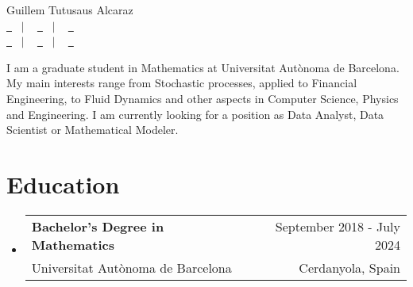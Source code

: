 \documentclass[a4paper,11pt,dvipsnames]{article}
\makeatletter
\newcommand{\resumeQuadHeading}[4]{
	\item
	\begin{tabular*}{0.96\textwidth}[t]{l@{\extracolsep{\fill}}r}
		\textbf{#1} & \small #2 \\
		\small#3 & \small #4 \\
	\end{tabular*}
}
\newcommand{\resumeHeadingListStart}{
	\begin{itemize}[leftmargin=0.15in, label={}]
	}
\newcommand{\resumeHeadingListEnd}{\end{itemize}}
\makeatother
\begin{document}
	
	\begin{center}
		{\Huge Guillem Tutusaus Alcaraz\vspace{2pt}} \\[1.25pc]
		\href{https://guillemtutusausalcaraz.weebly.com/}{\faLink \ } \ $|$ \ %
		\href{https://www.linkedin.com/in/guillemtutusausalcaraz/}{\faLinkedinSquare \ } \ $|$ \ %
		\href{https://github.com/Tutusaus}{\faGithub \ } \\[0.1pc] %
		\href{tel:+32674294157}{\faPhone \ } \ $|$ \ %
		\href{mailto:guillemtutusaus@gmail.com}{\faEnvelope \ } \ $|$ \ %
		\href{https://www.google.es/maps/place/Terrassa,+Barcelona/@41.558308,1.9759349,13z/data=!3m1!4b1!4m6!3m5!1s0x12a492e820fabbfd:0xab0d33c5f2c73098!8m2!3d41.5631482!4d2.0054917!16zL20vMGoycTc?hl=ca&entry=ttu}{\faHome \ } \\[1.5pc] %
	\end{center}
	
	\begin{justify}
		I am a graduate student in Mathematics at Universitat Autònoma de Bar\-ce\-lo\-na. My main interests range from Stochastic processes, applied to Financial Engineering, to Fluid Dynamics and other aspects in Computer Science, Physics and Engineering. I am currently looking for a position as Data Analyst, Data Scientist or Mathematical Modeler.
	\end{justify}
	
	
	
	\section{Education}
	
	\resumeHeadingListStart{}
	\resumeQuadHeading{Bachelor's Degree in Mathematics}{September 2018 - July 2024}
	{Universitat Autònoma de Barcelona}{Cerdanyola, Spain}
	\resumeHeadingListEnd{}
	
\end{document}
